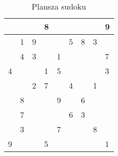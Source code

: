 \begin{table}[htbp]
\centering
\begin{tabular}{||l|l|l||l|l|l||l|l|l||} \hline\hline
  &   &   & 8 &   &   &   &   & 9 \\\hline
  & 1 & 9 &   &   & 5 & 8 & 3 &   \\\hline
  & 4 & 3 &   & 1 &   &   &   & 7 \\\hline\hline
4 &   &   & 1 & 5 &   &   &   & 3 \\\hline
  &   & 2 & 7 &   & 4 &   & 1 &   \\\hline
  & 8 &   &   & 9 &   & 6 &   &   \\\hline\hline
  & 7 &   &   &   & 6 & 3 &   &   \\\hline
  & 3 &   &   & 7 &   &   & 8 &   \\\hline
9 &   &   & 5 &   &   &   &   & 1 \\ \hline\hline
\end{tabular}
\label{tab:sudoku}
\caption{Plansza sudoku}
\end{table}